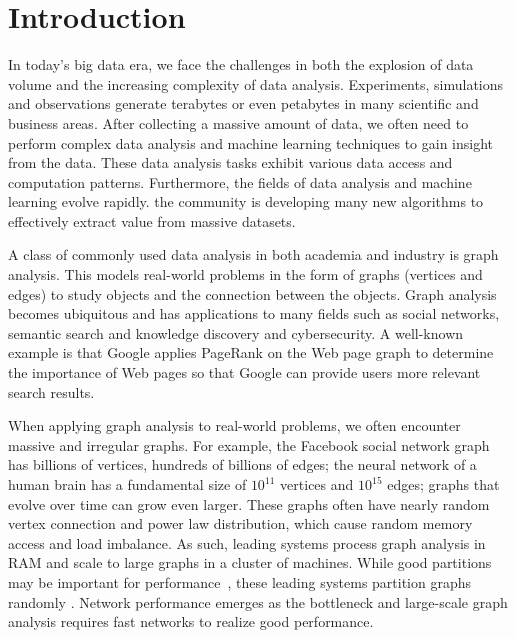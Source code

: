 \chapter{Introduction}
\label{sec:intro}

In today's big data era, we face the challenges in both the explosion of
data volume and the increasing complexity of data analysis. Experiments,
simulations and observations generate terabytes or
even petabytes in many scientific and business areas. After collecting
a massive amount of data, we often need to perform complex data analysis
and machine learning techniques to gain insight from the data. These data
analysis tasks exhibit various data access and computation patterns. Furthermore,
the fields of data analysis and machine learning evolve rapidly. the community
is developing many new algorithms to effectively extract value from massive
datasets.

A class of commonly used data analysis in both academia and industry is graph
analysis. This models
real-world problems in the form of graphs (vertices and edges) to study objects
and the connection between the objects. Graph analysis becomes ubiquitous
and has applications to many fields such as social networks, semantic search
and knowledge discovery and cybersecurity. A well-known example is that Google
applies PageRank \cite{pagerank} on the Web page graph to determine the importance
of Web pages so that Google can provide users more relevant search results.

When applying graph analysis to real-world problems, we often encounter
massive and irregular graphs. For example, the Facebook social network graph
has billions of vertices, hundreds of billions of edges; the neural network
of a human brain has a fundamental size of $10^{11}$ vertices and $10^{15}$ edges;
graphs that evolve over time can grow even larger. These graphs often have
nearly random vertex connection and power law distribution, which cause random
memory access and load imbalance. As such, leading systems process graph analysis
in RAM and scale to large graphs in a cluster of machines. While good partitions
may be important for performance~\cite{surfer}, these leading systems partition
graphs randomly \cite{powergraph}. Network performance emerges as the bottleneck
and large-scale graph analysis requires fast networks to realize good performance.

